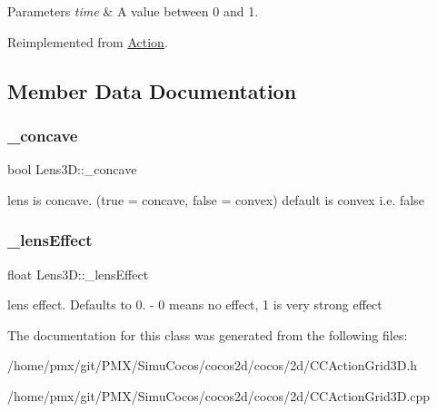 \begin{DoxyParams}{Parameters}
{\em time} & A value between 0 and 1. \\
\hline
\end{DoxyParams}


Reimplemented from \hyperlink{classAction_a937e646e63915e33ad05ba149bfcf239}{Action}.



\subsection{Member Data Documentation}
\mbox{\label{classLens3D_a76abf3128609e24193ecdbec60cac55a}} 
\subsubsection{\texorpdfstring{\+\_\+concave}{\_concave}}
{\footnotesize\ttfamily bool Lens3\+D\+::\+\_\+concave\hspace{0.3cm}{\ttfamily [protected]}}

lens is concave. (true = concave, false = convex) default is convex i.\+e. false \mbox{\label{classLens3D_af79217e24b57756ba0a7b2ab393888a6}} 
\subsubsection{\texorpdfstring{\+\_\+lens\+Effect}{\_lensEffect}}
{\footnotesize\ttfamily float Lens3\+D\+::\+\_\+lens\+Effect\hspace{0.3cm}{\ttfamily [protected]}}

lens effect. Defaults to 0. -\/ 0 means no effect, 1 is very strong effect 

The documentation for this class was generated from the following files\+:\begin{DoxyCompactItemize}
\item 
/home/pmx/git/\+P\+M\+X/\+Simu\+Cocos/cocos2d/cocos/2d/C\+C\+Action\+Grid3\+D.\+h\item 
/home/pmx/git/\+P\+M\+X/\+Simu\+Cocos/cocos2d/cocos/2d/C\+C\+Action\+Grid3\+D.\+cpp\end{DoxyCompactItemize}
